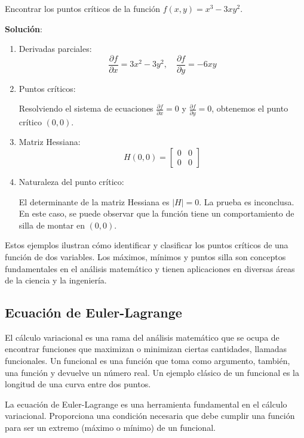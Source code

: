 \begin{example}
	
	Encontrar los puntos críticos de la función $f(x,y) = x^3 - 3xy^2$.
	
	\textbf{Solución}:
	
	\begin{enumerate}
		\item Derivadas parciales:
		$$\frac{\partial f}{\partial x} = 3x^2 - 3y^2, \quad \frac{\partial f}{\partial y} = -6xy$$
		
		\item Puntos críticos:
		
		Resolviendo el sistema de ecuaciones $\frac{\partial f}{\partial x} = 0$ y $\frac{\partial f}{\partial y} = 0$, obtenemos el punto crítico $(0, 0)$.
		
		\item Matriz Hessiana:
		$$H(0, 0) = \begin{bmatrix} 0 & 0 \\ 0 & 0 \end{bmatrix}$$
		
		\item Naturaleza del punto crítico:
		
		El determinante de la matriz Hessiana es $|H| = 0$. La prueba es inconclusa. En este caso, se puede observar que la función tiene un comportamiento de silla de montar en $(0,0)$.
	\end{enumerate}
\end{example}

Estos ejemplos ilustran cómo identificar y clasificar los puntos críticos de una función de dos variables.  Los máximos, mínimos y puntos silla son conceptos fundamentales en el análisis matemático y tienen aplicaciones en diversas áreas de la ciencia y la ingeniería.


\subsection{Ecuación de Euler-Lagrange}

El cálculo variacional es una rama del análisis matemático que se ocupa de encontrar funciones que maximizan o minimizan ciertas cantidades, llamadas funcionales. Un funcional es una función que toma como argumento, también, una función y devuelve un número real. Un ejemplo clásico de un funcional es la longitud de una curva entre dos puntos.

La ecuación de Euler-Lagrange es una herramienta fundamental en el cálculo variacional.  Proporciona una condición necesaria que debe cumplir una función para ser un extremo (máximo o mínimo) de un funcional.

